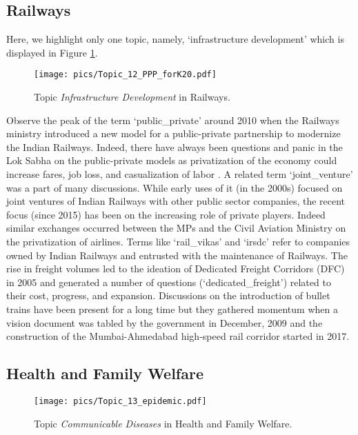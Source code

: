 \documentclass[10pt, a4paper]{article}
\begin{document}
\subsection{Railways}
\label{sec:railways}
Here, we highlight only one topic, namely, `infrastructure development' which is displayed in Figure  \ref{fig:LDAseq_Railways_full_T12}. 
\begin{figure}[!htbp]
  \centering 

        \texttt{[image: pics/Topic\_12\_PPP\_forK20.pdf]}
        \caption{Topic \textit{Infrastructure Development} in Railways.}
        \label{fig:LDAseq_Railways_full_T12}
\end{figure}
Observe the peak of the term `public\_private' around 2010 when the Railways ministry introduced a new model for a public-private partnership to modernize the Indian Railways.  Indeed, there have always been questions and panic in the Lok Sabha on the public-private models as  privatization of the economy could increase fares, job loss, and casualization of labor  \cite{makhija2006privatisation,reddy2019privatisation}. A related term `joint\_venture' was a part of many discussions. While early uses of it (in the 2000s) focused on joint ventures of Indian Railways with other public sector companies, the recent focus (since 2015) has been on the increasing role of private players. 
Indeed similar exchanges occurred between the MPs and the Civil Aviation Ministry on the privatization of airlines. 
Terms like `rail\_vikas' and `irsdc' refer to companies owned by Indian Railways and entrusted with the maintenance of Railways. The rise in freight volumes led to the ideation of Dedicated Freight Corridors (DFC) in 2005 
and generated a number of questions (`dedicated\_freight') related to their cost,  progress, and expansion. 
Discussions on the introduction of bullet trains have been present for a long time but they gathered momentum when a vision document was tabled by the government in December, 2009 and the construction of the Mumbai-Ahmedabad high-speed rail corridor started in 2017. 


\subsection{Health and Family Welfare} 
\label{sec:health}
\begin{figure}[!htbp]
    \centering 
    \texttt{[image: pics/Topic\_13\_epidemic.pdf]}
    \captionsetup{justification=centering}
        \caption{Topic \textit{Communicable Diseases} in Health and Family Welfare.}
        \label{fig:LDAseq_Health_full_T13}
\end{figure}
\end{document}

